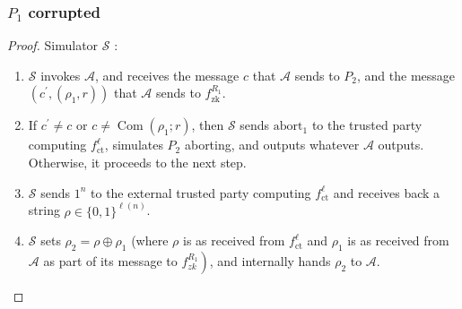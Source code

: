 \documentclass{beamer}
\begin{document}
    \begin{frame}
        \frametitle{$P_{1}$ corrupted}
    
        \begin{proof}
            Simulator $\mathcal{S}$ :
            \begin{enumerate}
                \item $\mathcal{S}$ invokes $\mathcal{A}$, and receives the message $c$ that $\mathcal{A}$ sends to $P_{2}$, and the message $\left(c^{\prime},\left(\rho_{1}, r\right)\right)$ that $\mathcal{A}$ sends to $f_{\mathrm{zk}}^{R_{1}}$.
                \item  If $c^{\prime} \neq c$ or $c \neq \operatorname{Com}\left(\rho_{1} ; r\right)$, then $\mathcal{S}$ sends $\mathrm{abort}_{1}$ to the trusted party computing $f_{\mathrm{ct}}^{\ell}$, simulates $P_{2}$ aborting, and outputs whatever $\mathcal{A}$ outputs. Otherwise, it proceeds to the next step.
                \item $\mathcal{S}$ sends $1^{n}$ to the external trusted party computing $f_{\mathrm{ct}}^{\ell}$ and receives back a string $\rho \in\{0,1\}^{\ell(n)}$.
                \item $\mathcal{S}$ sets $\rho_{2}=\rho \oplus \rho_{1}$ (where $\rho$ is as received from $f_{\mathrm{ct}}^{\ell}$ and $\rho_{1}$ is as received from $\mathcal{A}$ as part of its message to $\left.f_{z k}^{R_{1}}\right)$, and internally hands $\rho_{2}$ to $\mathcal{A}$.

            \end{enumerate}
        \end{proof}
    
    \end{frame}
\end{document}
